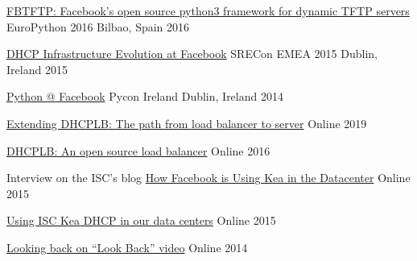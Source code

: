 
\begin{cvhonors}
  \cvhonor
  {\href{https://www.angelofailla.com/public_talks/2016-europython-fbtftp/}{FBTFTP: Facebook's open source python3 framework for dynamic TFTP servers}} %
  {EuroPython 2016}
  {Bilbao, Spain} %
  {2016} %

  \cvhonor
  {\href{https://www.angelofailla.com/public_talks/2015-srecon-emea-kea/}{DHCP Infrastructure Evolution at Facebook}}
  {SRECon EMEA 2015}
  {Dublin, Ireland} %
  {2015} %

  \cvhonor
  {\href{https://www.angelofailla.com/public_talks/2014-pyconireland-python@fb/}{Python @ Facebook}}
  {Pycon Ireland}
  {Dublin, Ireland} %
  {2014} %

\end{cvhonors}


\begin{cvhonors}
  \cvhonor
  {\href{https://engineering.fb.com/2019/05/28/data-infrastructure/dhcplb-server/}{Extending DHCPLB: The path from load balancer to server}}
  {} %
  {Online} %
  {2019} %

  \cvhonor
  {\href{https://engineering.fb.com/2016/09/13/data-infrastructure/dhcplb-an-open-source-load-balancer/}{DHCPLB: An open source load balancer}}
  {} %
  {Online} %
  {2016} %

  \cvhonor
  {Interview on the ISC's blog}
  {\href{https://www.isc.org/blogs/how-facebook-is-using-kea-in-the-datacenter/}{How Facebook is Using Kea in the Datacenter}}
  {Online} %
  {2015} %

  \cvhonor
  {\href{https://engineering.fb.com/2015/07/21/core-infra/using-isc-kea-dhcp-in-our-data-centers/}{Using ISC Kea DHCP in our data centers}}
  {} %
  {Online} %
  {2015} %

  \cvhonor
  {\href{https://engineering.fb.com/2014/03/13/web/looking-back-on-look-back-videos/}{Looking back on “Look Back” video}}
  {}
  {Online} %
  {2014} %

\end{cvhonors}